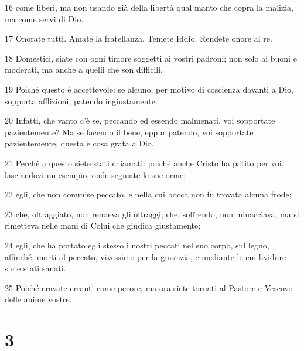 \par 16 come liberi, ma non usando già della libertà qual manto che copra la malizia, ma come servi di Dio.
\par 17 Onorate tutti. Amate la fratellanza. Temete Iddio. Rendete onore al re.
\par 18 Domestici, siate con ogni timore soggetti ai vostri padroni; non solo ai buoni e moderati, ma anche a quelli che son difficili.
\par 19 Poiché questo è accettevole: se alcuno, per motivo di coscienza davanti a Dio, sopporta afflizioni, patendo ingiustamente.
\par 20 Infatti, che vanto c'è se, peccando ed essendo malmenati, voi sopportate pazientemente? Ma se facendo il bene, eppur patendo, voi sopportate pazientemente, questa è cosa grata a Dio.
\par 21 Perché a questo siete stati chiamati: poiché anche Cristo ha patito per voi, lasciandovi un esempio, onde seguiate le sue orme;
\par 22 egli, che non commise peccato, e nella cui bocca non fu trovata alcuna frode;
\par 23 che, oltraggiato, non rendeva gli oltraggi; che, soffrendo, non minacciava, ma si rimetteva nelle mani di Colui che giudica giustamente;
\par 24 egli, che ha portato egli stesso i nostri peccati nel suo corpo, sul legno, affinché, morti al peccato, vivessimo per la giustizia, e mediante le cui lividure siete stati sanati.
\par 25 Poiché eravate erranti come pecore; ma ora siete tornati al Pastore e Vescovo delle anime vostre.

\chapter{3}

